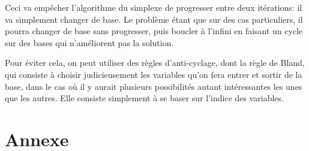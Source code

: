 \documentclass{scrartcl}
\begin{document}
      Ceci va empêcher l'algorithme du simplexe de progresser entre deux
      itérations: il va simplement changer de base. Le problème étant que sur
      des cas particuliers, il pourra changer de base sans progresser, puis
      boucler à l'infini en faisant un cycle sur des bases qui n'améliorent pas
      la solution.

      Pour éviter cela, on peut utiliser des règles d'anti-cyclage, dont la
      règle de Bland, qui consiste à choisir judicieusement les variables qu'on
      fera entrer et sortir de la base, dans le cas où il y aurait plusieurs
      possibilités autant intéressantes les unes que les autres. Elle consiste
      simplement à se baser sur l'indice des variables. %

\section{Annexe}
  \lstlistoflistings
  
  
  
\end{document}
